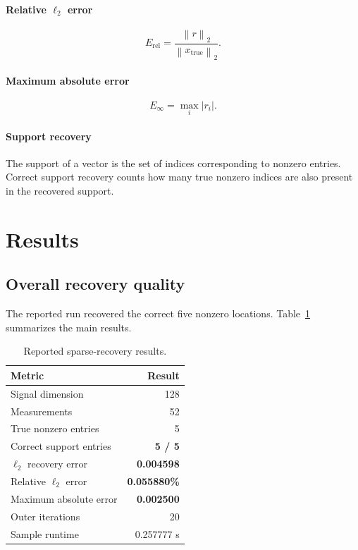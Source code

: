 \documentclass[11pt]{article}
\newcommand{\norm}[1]{\left\lVert #1 \right\rVert}
\begin{document}
\paragraph{Relative $\ell_2$ error}
\begin{equation}
E_{\text{rel}}
=
\frac{\norm{r}_2}{\norm{x_{\text{true}}}_2}.
\end{equation}

\paragraph{Maximum absolute error}
\begin{equation}
E_{\infty}
=
\max_i |r_i|.
\end{equation}

\paragraph{Support recovery}
The support of a vector is the set of indices corresponding to nonzero entries. Correct support recovery counts how many true nonzero indices are also present in the recovered support.

\section{Results}
\subsection{Overall recovery quality}

The reported run recovered the correct five nonzero locations. Table~\ref{tab:metrics} summarizes the main results.

\begin{table}[H]
\centering
\caption{Reported sparse-recovery results.}
\label{tab:metrics}
\begin{tabular}{lr}
\toprule
\textbf{Metric} & \textbf{Result} \\
\midrule
Signal dimension & 128 \\
Measurements & 52 \\
True nonzero entries & 5 \\
Correct support entries & \textbf{5 / 5} \\
$\ell_2$ recovery error & \textbf{0.004598} \\
Relative $\ell_2$ error & \textbf{0.055880\%} \\
Maximum absolute error & \textbf{0.002500} \\
Outer iterations & 20 \\
Sample runtime & 0.257777 s \\
\bottomrule
\end{tabular}
\end{table}
\end{document}
